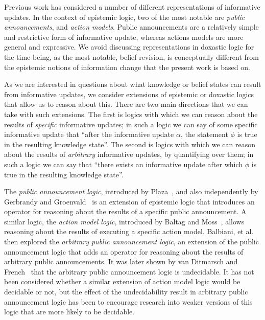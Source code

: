 Previous work has considered a number of different representations of
informative updates. In the context of epistemic logic, two of the most notable
are {\em public announcements}, and {\em action models}. Public announcements
are a relatively simple and restrictive form of informative update, whereas
actions models are more general and expressive. We avoid discussing
representations in doxastic logic for the time being, as the most notable,
belief revision, is conceptually different from the epistemic notions of
information change that the present work is based on.

As we are interested in questions about what knowledge or belief states can
result from informative updates, we consider extensions of epistemic or doxastic
logics that allow us to reason about this. There are two main directions that we
can take with such extensions. The first is logics with which we can reason
about the results of {\em specific} informative updates; in such a logic we can
say of some specific informative update that ``after the informative update
$\alpha$, the statement $\phi$ is true in the resulting knowledge state''. The
second is logics with which we can reason about the results of {\em arbitrary}
informative updates, by quantifying over them; in such a logic we can say
that ``there exists an informative update after which $\phi$ is true in the
resulting knowledge state''.

The {\em public announcement logic}, introduced by
Plaza~\cite{plaza2007logics}, and also independently by Gerbrandy and
Groenvald~\cite{gerbrandy1997reasoning} is an extension of epistemic logic that
introduces an operator for reasoning about the results of a specific public
announcement. A similar logic, the {\em action model logic}, introduced by
Baltag and Moss~\cite{baltag2004logics}, allows reasoning about the results of
executing a specific action model. Balbiani, et
al.~\cite{balbiani2007arbitrary} then explored the {\em arbitrary public
announcement logic}, an extension of the public announcement logic that adds an
operator for reasoning about the results of arbitrary public announcements.  It
was later shown by van Ditmarsch and French~\cite{french2008undecidability}
that the arbitrary public announcement logic is undecidable. It has not been
considered whether a similar extension of action model logic would be decidable
or not, but the effect of the undecidability result in arbitrary public
announcement logic has been to encourage research into weaker versions of this
logic that are more likely to be decidable.

